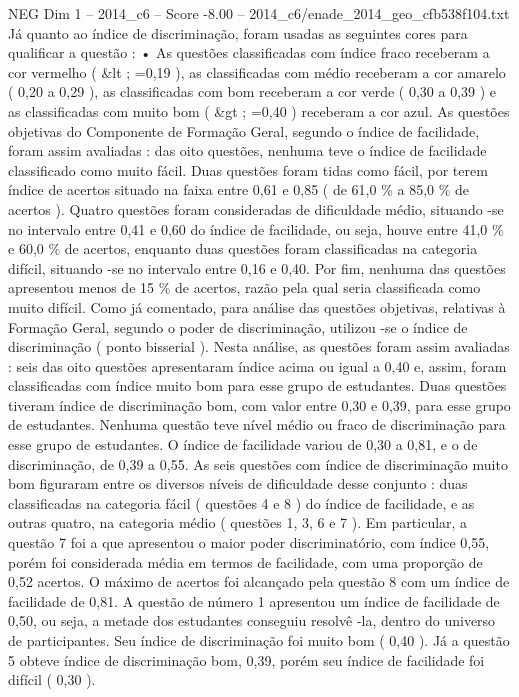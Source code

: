 \begin{textsample}{NEG Dim 1 – 2014\_c6 – Score -8.00 – 2014\_c6/enade\_2014\_geo\_cfb538f104.txt}
Já quanto ao índice de discriminação, foram usadas as seguintes cores para qualificar a questão : • As questões classificadas com índice fraco receberam a cor vermelho ( \&lt ; =0,19 ), as classificadas com médio receberam a cor amarelo ( 0,20 a 0,29 ), as classificadas com bom receberam a cor verde ( 0,30 a 0,39 ) e as classificadas com muito bom ( \&gt ; =0,40 ) receberam a cor azul.
As questões objetivas do Componente de Formação Geral, segundo o índice de facilidade, foram assim avaliadas : das oito questões, nenhuma teve o índice de facilidade classificado como muito fácil.
Duas questões foram tidas como fácil, por terem índice de acertos situado na faixa entre 0,61 e 0,85 ( de 61,0 \% a 85,0 \% de acertos ).
Quatro questões foram consideradas de dificuldade médio, situando -se no intervalo entre 0,41 e 0,60 do índice de facilidade, ou seja, houve entre 41,0 \% e 60,0 \% de acertos, enquanto duas questões foram classificadas na categoria difícil, situando -se no intervalo entre 0,16 e 0,40.
Por fim, nenhuma das questões apresentou menos de 15 \% de acertos, razão pela qual seria classificada como muito difícil.
Como já comentado, para análise das questões objetivas, relativas à Formação Geral, segundo o poder de discriminação, utilizou -se o índice de discriminação ( ponto bisserial ).
Nesta análise, as questões foram assim avaliadas : seis das oito questões apresentaram índice acima ou igual a 0,40 e, assim, foram classificadas com índice muito bom para esse grupo de estudantes.
Duas questões tiveram índice de discriminação bom, com valor entre 0,30 e 0,39, para esse grupo de estudantes.
Nenhuma questão teve nível médio ou fraco de discriminação para esse grupo de estudantes.
O índice de facilidade variou de 0,30 a 0,81, e o de discriminação, de 0,39 a 0,55.
As seis questões com índice de discriminação muito bom figuraram entre os diversos níveis de dificuldade desse conjunto : duas classificadas na categoria fácil ( questões 4 e 8 ) do índice de facilidade, e as outras quatro, na categoria médio ( questões 1, 3, 6 e 7 ).
Em particular, a questão 7 foi a que apresentou o maior poder discriminatório, com índice 0,55, porém foi considerada média em termos de facilidade, com uma proporção de 0,52 acertos.
O máximo de acertos foi alcançado pela questão 8 com um índice de facilidade de 0,81.
A questão de número 1 apresentou um índice de facilidade de 0,50, ou seja, a metade dos estudantes conseguiu resolvê -la, dentro do universo de participantes.
Seu índice de discriminação foi muito bom ( 0,40 ).
Já a questão 5 obteve índice de discriminação bom, 0,39, porém seu índice de facilidade foi difícil ( 0,30 ).

\end{textsample}

